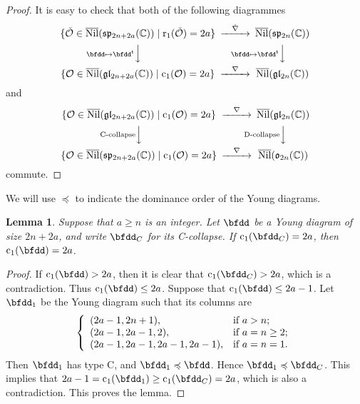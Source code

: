 \documentclass[12pt,a4paper]{amsart}
\newcommand{\BC}{{\mathbb {C}}}
\newcommand{\CO}{{\mathcal {O}}}
\newcommand{\g}{\mathfrak g}
\newcommand{\p}{\mathfrak p}
\renewcommand{\l}{\mathfrak l}
\newcommand{\s}{\mathfrak s}
\renewcommand{\o}{\mathfrak o}
\newcommand{\be}{\begin {equation}}
\newcommand{\ee}{\end {equation}}
\numberwithin{equation}{section}
\newtheorem{lem}[thm]{Lemma}
\theoremstyle{remark}
\begin{document}
\begin{proof} It is easy to check that both of the following diagrammes
\[
 \begin{CD}
            \{\check \CO\in \overline{\mathrm{Nil}}(\s\p_{2n+2a}(\BC))\mid \mathrm{r}_1(\check \CO)=2a\} @>  \check \nabla  >> \overline{\mathrm{Nil}}(\s\p_{2n}(\BC)) \\
            @V \bfdd\mapsto \textrm{$\bfdd^{\mathrm t}$} VV           @V\bfdd\mapsto \textrm{$\bfdd^{\mathrm t}$}V V\\
               \{\CO\in \overline{\mathrm{Nil}}(\g\l_{2n+2a}(\BC))\mid \mathrm{c}_1(\CO)=2a\}
             @> \nabla   >>  \overline{\mathrm{Nil}}(\g\l_{2n}(\BC))\\
  \end{CD}
\]
and
\[
 \begin{CD}
            \{ \CO\in \overline{\mathrm{Nil}}(\g\l_{2n+2a}(\BC))\mid \mathrm{c}_1( \CO)=2a\} @>   \nabla  >> \overline{\mathrm{Nil}}(\g\l_{2n}(\BC)) \\
            @V \textrm{C-collapse} VV           @V \textrm{D-collapse}V V\\
               \{\CO\in \overline{\mathrm{Nil}}(\s\p_{2n+2a}(\BC))\mid \mathrm{c}_1( \CO)=2a\}
             @> \nabla   >>  \overline{\mathrm{Nil}}(\o_{2n}(\BC))\\
  \end{CD}
\]
commute. %
\end{proof}


We will use $\preccurlyeq$ to indicate the dominance order of the Young diagrams.

\begin{lem}\label{aaaa}
Suppose that $a\geq n$ is an integer. Let $\bfdd $ be a Young diagram of size $2n+2a$, and write $\bfdd_C$ for its C-collapse. If $\mathrm c_1(\bfdd_C)=2a$, then $\mathrm c_1(\bfdd)=2a$. %

\end{lem}
\begin{proof}
If $\mathrm c_1(\bfdd)>2a$, then it is clear that $\mathrm c_1(\bfdd_C)>2a$, which is a contradiction. Thus  $\mathrm c_1(\bfdd)\leq 2a$. Suppose that $\mathrm c_1(\bfdd)\leq 2a-1$. Let $\bfdd_1$ be the Young diagram  such that its columns are
\[
  \left\{
    \begin{array}{ll}
      (2a-1, 2n+1), & \hbox{if $a>n$;} \\
      (2a-1,2a-1,2), & \hbox{if $a=n\geq 2$;} \\
      (2a-1,2a-1,2a-1,2a-1), & \hbox{if $a=n=1$.}
    \end{array}
  \right.
\]
Then $\bfdd_1$ has type C, and  $\bfdd_1\preccurlyeq \bfdd$. Hence $\bfdd_1\preccurlyeq \bfdd_C$. This implies that $2a-1=\mathrm c_1(\bfdd_1)\geq \mathrm c_1(\bfdd_C)=2a$, which is also a contradiction. This proves the lemma.
\end{proof}
\end{document}
